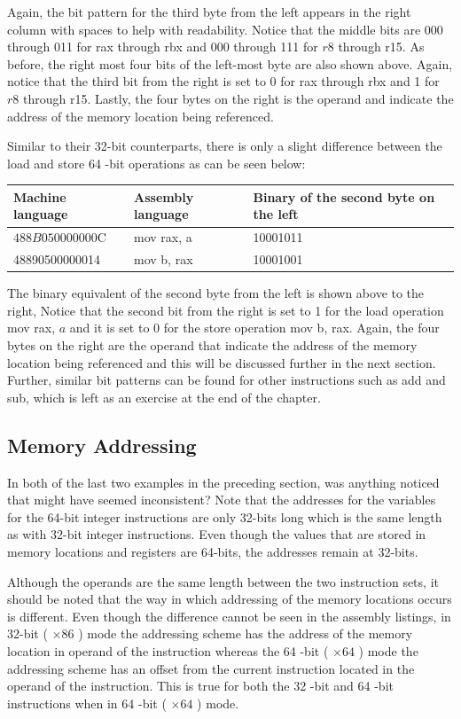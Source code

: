 \documentclass[10pt]{book}
\begin{document}
Again, the bit pattern for the third byte from the left appears in the right column with spaces to help with readability. Notice that the middle bits are 000 through 011 for rax through rbx and 000 through 111 for $r 8$ through r15. As before, the right most four bits of the left-most byte are also shown above. Again, notice that the third bit from the right is set to 0 for rax through rbx and 1 for $r 8$ through r15. Lastly, the four bytes on the right is the operand and indicate the address of the memory location being referenced.

Similar to their 32-bit counterparts, there is only a slight difference between the load and store 64 -bit operations as can be seen below:

\begin{center}
\begin{tabular}{|l|l|l|}
\hline
Machine language & Assembly language & Binary of the second byte on the left \\
\hline
$488 B 050000000 \mathrm{C}$ & mov rax, a & 10001011 \\
\hline
48890500000014 & mov b, rax & 10001001 \\
\hline
\end{tabular}
\end{center}

The binary equivalent of the second byte from the left is shown above to the right, Notice that the second bit from the right is set to 1 for the load operation mov rax, $a$ and it is set to 0 for the store operation mov b, rax. Again, the four bytes on the right are the operand that indicate the address of the memory location being referenced and this will be discussed further in the next section. Further, similar bit patterns can be found for other instructions such as add and sub, which is left as an exercise at the end of the chapter.

\subsection{Memory Addressing}
In both of the last two examples in the preceding section, was anything noticed that might have seemed inconsistent? Note that the addresses for the variables for the 64-bit integer instructions are only 32-bits long which is the same length as with 32-bit integer instructions. Even though the values that are stored in memory locations and registers are 64-bits, the addresses remain at 32-bits.


Although the operands are the same length between the two instruction sets, it should be noted that the way in which addressing of the memory locations occurs is different. Even though the difference cannot be seen in the assembly listings, in 32-bit ( $\times 86$ ) mode the addressing scheme has the address of the memory location in operand of the instruction whereas the 64 -bit ( $\times 64$ ) mode the addressing scheme has an offset from the current instruction located in the operand of the instruction. This is true for both the 32 -bit and 64 -bit instructions when in 64 -bit ( $\times 64$ ) mode.
\end{document}
